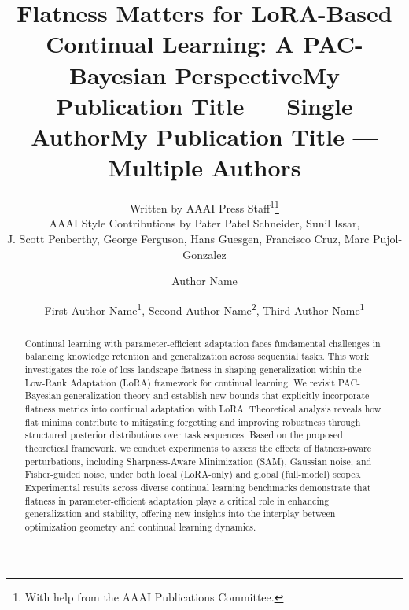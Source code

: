 \documentclass[letterpaper]{article} %
\title{Flatness Matters for LoRA-Based Continual Learning: A PAC-Bayesian Perspective}
\author{
    Written by AAAI Press Staff\textsuperscript{\rm 1}\thanks{With help from the AAAI Publications Committee.}\\
    AAAI Style Contributions by Pater Patel Schneider,
    Sunil Issar,\\
    J. Scott Penberthy,
    George Ferguson,
    Hans Guesgen,
    Francisco Cruz\equalcontrib,
    Marc Pujol-Gonzalez\equalcontrib
}
\title{My Publication Title --- Single Author}
\author {
    Author Name
}
\title{My Publication Title --- Multiple Authors}
\author {
    First Author Name\textsuperscript{\rm 1},
    Second Author Name\textsuperscript{\rm 2},
    Third Author Name\textsuperscript{\rm 1}
}
\begin{document}
\maketitle

\begin{abstract}
Continual learning with parameter-efficient adaptation faces fundamental challenges in balancing knowledge retention and generalization across sequential tasks. This work investigates the role of loss landscape flatness in shaping generalization within the Low-Rank Adaptation (LoRA) framework for continual learning. We revisit PAC-Bayesian generalization theory and establish new bounds that explicitly incorporate flatness metrics into continual adaptation with LoRA. Theoretical analysis reveals how flat minima contribute to mitigating forgetting and improving robustness through structured posterior distributions over task sequences.  Based on the proposed theoretical framework, we conduct experiments to assess the effects of flatness-aware perturbations, including Sharpness-Aware Minimization (SAM), Gaussian noise, and Fisher-guided noise, under both local (LoRA-only) and global (full-model) scopes. Experimental results across diverse continual learning benchmarks demonstrate that flatness in parameter-efficient adaptation plays a critical role in enhancing generalization and stability, offering new insights into the interplay between optimization geometry and continual learning dynamics.






 









\end{abstract}
\end{document}
